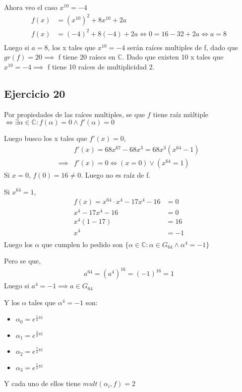 Ahora veo el caso $ x^{10} = -4 $
\begin{align*}
    f(x) &= (x^{10})^2 +8x^{10} + 2a \\
    f(x) &= (-4)^2 +8(-4) + 2a \iff 0 = 16 - 32 + 2a \iff a = 8 \\
\end{align*}
Luego si $ a = 8 $, los x tales que $ x^{10} = -4 $ serán raíces multiples de f, dado que $gr(f) = 20 \implies $ f tiene 20 raíecs en $\mathbb{C}$. Dado que existen 10 x tales que $x^{10} = -4 \implies $ f tiene 10 raíces de multiplicidad 2.  

\subsection{Ejercicio 20}
Por propiedades de las raíces multiples, se que $f$ tiene raíz múltiple $ \iff \exists \alpha \in \mathbb{C}: f(\alpha) = 0 \wedge f'(\alpha) = 0 $

Luego busco los x tales que $f'(x) = 0$,
\begin{align*}
    &f'(x) = 68x^{67} - 68x^{3} = 68x^3(x^{64}-1) \\
    \implies &f'(x) = 0 \iff (x=0) \vee (x^{64}=1)
\end{align*}
Si $x=0$, $ f(0) = 16 \neq 0 $. Luego no es raíz de f.

Si $x^{64} = 1$,
\begin{align*}
    f(x) = x^{64} \cdot x^4 - 17x^4 - 16 &= 0 \\
    x^4 - 17x^4 - 16 &= 0 \\
    x^4(1-17) &= 16 \\
    x^4 &= -1 \\
\end{align*}
Luego los $\alpha$ que cumplen lo pedido son $ \{\alpha \in \mathbb{C}: \alpha \in G_{64} \wedge \alpha^4=-1 \} $

Pero se que,
\begin{align*}
    a^{64} = (a^{4})^{16} = (-1)^{16} = 1
\end{align*}
Luego si $ a^{4} = -1 \implies a \in G_{64} $

Y los $ \alpha $ tales que $ \alpha^4 = -1 $ son:
\begin{itemize}
    \item $ \alpha_0 = e^{\frac{1}{4}\pi i} $
    \item $ \alpha_1 = e^{\frac{3}{4}\pi i} $
    \item $ \alpha_2 = e^{\frac{5}{4}\pi i} $
    \item $ \alpha_3 = e^{\frac{7}{4}\pi i} $
\end{itemize}
Y cada uno de ellos tiene $ mult(\alpha_i, f) = 2$

